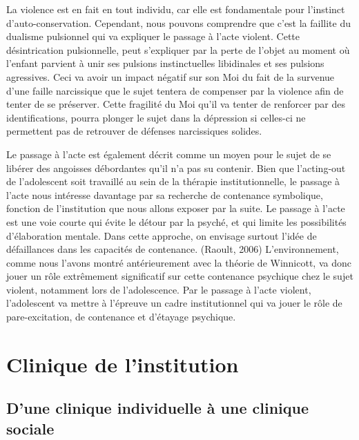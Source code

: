\documentclass[12pt, a4paper]{book}
\begin{document}
\begin{spacing}{1.5}
La violence est en fait en tout individu, car elle est fondamentale pour l'instinct d'auto-conservation. Cependant, nous pouvons comprendre que c'est la faillite du dualisme pulsionnel qui va expliquer le passage à l'acte violent. Cette désintrication pulsionnelle, peut s'expliquer par la perte de l'objet au moment où l'enfant parvient à unir ses pulsions instinctuelles libidinales et ses pulsions agressives. Ceci va avoir un impact négatif sur son Moi du fait de la survenue d'une faille narcissique  que le sujet tentera de compenser par la violence afin de tenter de se préserver. Cette fragilité du Moi qu'il va tenter de renforcer par des identifications, pourra plonger le sujet dans la dépression si celles-ci ne permettent pas de retrouver de défenses narcissiques solides. 

Le passage à l'acte est également décrit comme un moyen pour le sujet de se libérer des angoisses débordantes qu'il n'a pas su contenir. Bien que l'acting-out de l'adolescent soit travaillé au sein de la thérapie institutionnelle, le passage à l'acte nous intéresse davantage par sa recherche de contenance symbolique, fonction de l'institution que nous allons exposer par la suite.  Le passage à l'acte est une voie courte qui évite le détour par la psyché, et qui limite les possibilités d'élaboration mentale. Dans cette approche, on envisage surtout l'idée de défaillances  dans les capacités de contenance. (Raoult, 2006)  L'environnement, comme nous l'avons montré antérieurement avec la théorie de Winnicott, va donc jouer un rôle extrêmement significatif sur cette contenance psychique chez le sujet violent, notamment lors de l'adolescence. Par le passage à l'acte violent, l'adolescent va mettre à l'épreuve un cadre institutionnel qui va jouer le rôle de pare-excitation, de contenance et d'étayage psychique.

\chapter{Clinique de l'institution}

\section{D'une clinique individuelle à une clinique sociale}


\end{spacing}
\end{document}
